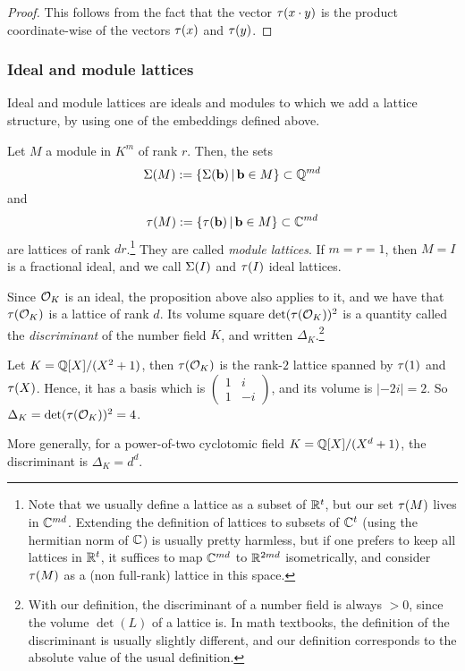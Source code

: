 \begin{proof}
This follows from the fact that the vector $\tau(x \cdot y)$ is the product coordinate-wise of the vectors $\tau(x)$ and $\tau(y)$.
\end{proof}

\subsubsection{Ideal and module lattices}
\label{sec:id-mod-lat}
Ideal and module lattices are ideals and modules to which we add a lattice structure, by using one of the embeddings defined above.

\begin{proposition}
Let $M$ a module in $K^m$ of rank $r$. Then, the sets 
\[\Sigma(M) := \{ \Sigma(\mathbf b)\,|\, \mathbf b\in M\} \subset \mathbb{Q}^{md}\]
and 
\[\tau(M) := \{ \tau(\mathbf b)\,|\, \mathbf b\in M\} \subset \mathbb{C}^{md}\]
are lattices of rank $dr$.\footnote{Note that we usually define a lattice as a subset of $\mathbb{R}^t$, but our set $\tau(M)$ lives in $\mathbb{C}^{md}$. Extending the definition of lattices to subsets of $\mathbb{C}^t$ (using the hermitian norm of $\mathbb{C}$) is usually pretty harmless, but if one prefers to keep all lattices in $\mathbb{R}^t$, it suffices to map $\mathbb{C}^{md}$ to $\mathbb{R}^{2md}$ isometrically, and consider $\tau(M)$ as a (non full-rank) lattice in this space.}
They are called \textit{module lattices}. If $m = r = 1$, then $M = I$ is a fractional ideal, and we call $\Sigma(I)$ and $\tau(I)$ ideal lattices.
\end{proposition}

Since $\mathcal{O}_K$ is an ideal, the proposition above also applies to it, and we have that $\tau(\mathcal{O}_K)$ is a lattice of rank $d$. Its volume square $\det(\tau(\mathcal{O}_K))^2$ is a quantity called the \textit{discriminant} of the number field $K$, and written $\Delta_K$.\footnote{With our definition, the discriminant of a number field is always $> 0$, since the volume $\det(L)$ of a lattice is. In math textbooks, the definition of the discriminant is usually slightly different, and our definition corresponds to the absolute value of the usual definition.}

\begin{example}
Let $K = \mathbb{Q}[X]/(X^2+1)$, then $\tau(\mathcal{O}_K)$ is the rank-$2$ lattice spanned by $\tau(1)$ and $\tau(X)$. Hence, it has a basis which is $\begin{pmatrix}
1 & i \\
1 & -i
\end{pmatrix}$, and its volume is $|-2i| = 2$. So $\Delta_K = \det(\tau(\mathcal{O}_K))^2 = 4$.

More generally, for a power-of-two cyclotomic field $K = \mathbb{Q}[X]/(X^d+1)$, the discriminant is $\Delta_K = d^d$.
\end{example}

